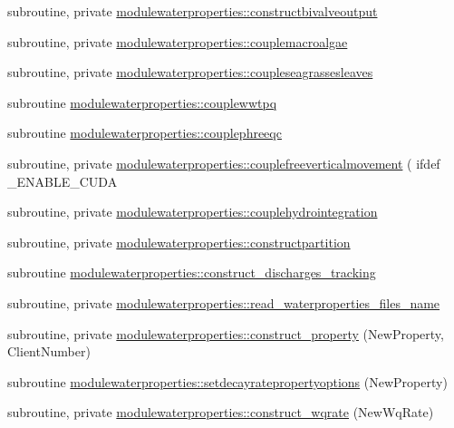 \begin{DoxyCompactItemize}
\item 
subroutine, private \mbox{\hyperlink{namespacemodulewaterproperties_abe78da28c4264216e9c5f3d2e8a558f4}{modulewaterproperties\+::constructbivalveoutput}}
\item 
subroutine, private \mbox{\hyperlink{namespacemodulewaterproperties_a2eeb2f2e0e29e2293f16af83dcbe02bb}{modulewaterproperties\+::couplemacroalgae}}
\item 
subroutine, private \mbox{\hyperlink{namespacemodulewaterproperties_ad4fbcdc5c8f0cd8982dbe65a88f54ab8}{modulewaterproperties\+::coupleseagrassesleaves}}
\item 
subroutine \mbox{\hyperlink{namespacemodulewaterproperties_a2c86f539e4715abad89dc127b5f17d20}{modulewaterproperties\+::couplewwtpq}}
\item 
subroutine \mbox{\hyperlink{namespacemodulewaterproperties_a191c738815d3d3376105cfd51b26b59d}{modulewaterproperties\+::couplephreeqc}}
\item 
subroutine, private \mbox{\hyperlink{namespacemodulewaterproperties_ab19037aba70755844475216443ec3a35}{modulewaterproperties\+::couplefreeverticalmovement}} ( ifdef \+\_\+\+E\+N\+A\+B\+L\+E\+\_\+\+C\+U\+DA
\item 
subroutine, private \mbox{\hyperlink{namespacemodulewaterproperties_a52ab6cc6910ba77bfa6154aca1f67db0}{modulewaterproperties\+::couplehydrointegration}}
\item 
subroutine, private \mbox{\hyperlink{namespacemodulewaterproperties_ac9b1f4e5840ee5c5f36ff7bee993386b}{modulewaterproperties\+::constructpartition}}
\item 
subroutine \mbox{\hyperlink{namespacemodulewaterproperties_a30c3709afcaafdcec85f3efda5a73d03}{modulewaterproperties\+::construct\+\_\+discharges\+\_\+tracking}}
\item 
subroutine, private \mbox{\hyperlink{namespacemodulewaterproperties_ae31629679bdc4c42e1d3884a2f046435}{modulewaterproperties\+::read\+\_\+waterproperties\+\_\+files\+\_\+name}}
\item 
subroutine, private \mbox{\hyperlink{namespacemodulewaterproperties_a87d8b877e916e4ea3318d7d568732d12}{modulewaterproperties\+::construct\+\_\+property}} (New\+Property, Client\+Number)
\item 
subroutine \mbox{\hyperlink{namespacemodulewaterproperties_a9b03fe6ccf9de1a1c29846e4a8104c87}{modulewaterproperties\+::setdecayratepropertyoptions}} (New\+Property)
\item 
subroutine, private \mbox{\hyperlink{namespacemodulewaterproperties_a8f1edb788021e4c68656d11b8b90ea26}{modulewaterproperties\+::construct\+\_\+wqrate}} (New\+Wq\+Rate)

\end{DoxyCompactItemize}
